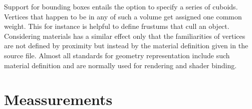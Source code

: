 Support for bounding boxes entails the option to specify a series of cuboids.
Vertices that happen to be in any of such a volume get assigned one common weight.
This for instance is helpful to define frustums that cull an object.\\
Considering materials has a similar effect only that the familiarities of vertices are not defined by proximity but instead by the material definition given in the source file.
Almost all standards for geometry representation include such material definition and are normally used for rendering and shader binding.


\newpage
\section{Meassurements}
\label{topstoc5}

